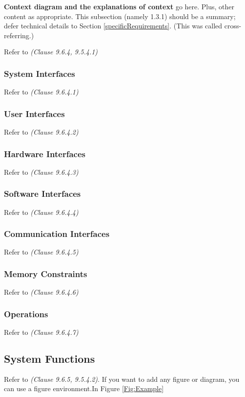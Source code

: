 \textbf{Context diagram and the explanations of context} go here. Plus, other content as appropriate. This subsection (namely 1.3.1) should be a summary; defer technical details to Section \ref{specificRequirements}. (This was called cross-referring.)

Refer to \textit{(Clause 9.6.4, 9.5.4.1)}
\subsubsection{System Interfaces}
Refer to \textit{(Clause 9.6.4.1)}
\subsubsection{User Interfaces}
Refer to \textit{(Clause 9.6.4.2)}
\subsubsection{Hardware Interfaces}
Refer to \textit{(Clause 9.6.4.3)}
\subsubsection{Software Interfaces}
Refer to \textit{(Clause 9.6.4.4)}
\subsubsection{Communication Interfaces}
Refer to \textit{(Clause 9.6.4.5)}
\subsubsection{Memory Constraints}
Refer to \textit{(Clause 9.6.4.6)}
\subsubsection{Operations}
Refer to \textit{(Clause 9.6.4.7)}

\subsection{System Functions}

Refer to \textit{(Clause 9.6.5, 9.5.4.2)}. If you want to add any figure or diagram, you can use a figure environment.In Figure \ref{Fig:Example}

